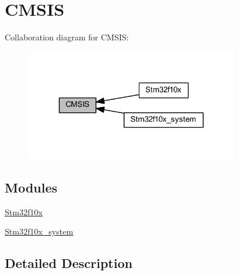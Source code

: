 \hypertarget{group___c_m_s_i_s}{}\section{C\+M\+S\+IS}
\label{group___c_m_s_i_s}
Collaboration diagram for C\+M\+S\+IS\+:
\nopagebreak
\begin{figure}[H]
\begin{center}
\leavevmode
\includegraphics[width=264pt]{group___c_m_s_i_s}
\end{center}
\end{figure}
\subsection*{Modules}
\begin{DoxyCompactItemize}
\item 
\hyperlink{group__stm32f10x}{Stm32f10x}
\item 
\hyperlink{group__stm32f10x__system}{Stm32f10x\+\_\+system}
\end{DoxyCompactItemize}


\subsection{Detailed Description}
